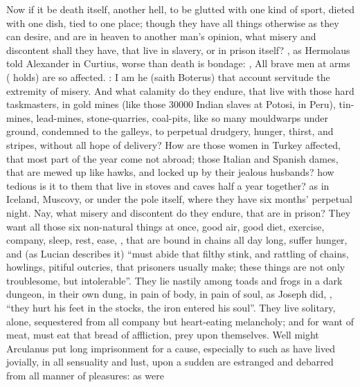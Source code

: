 Now if it be death itself, another hell, to be glutted with one kind of sport,
dieted with one dish, tied to one place; though they have all things otherwise
as they can desire, and are in heaven to another man's opinion, what misery and
discontent shall they have, that live in slavery, or in prison itself? , as Hermolaus told Alexander in
Curtius, worse than death is bondage:
, All brave men at arms (\Tully{} holds) are so affected.
: I am he (saith Boterus) that account servitude the
extremity of misery. And what calamity do they endure, that live with those
hard taskmasters, in gold mines (like those 30\thinspace{}000
Indian slaves at Potosi, in Peru), tin-mines, lead-mines,
stone-quarries, coal-pits, like so many mouldwarps under ground, condemned to
the galleys, to perpetual drudgery, hunger, thirst, and stripes, without all
hope of delivery? How are those women in Turkey affected, that most part of the
year come not abroad; those Italian and Spanish dames, that are mewed up like
hawks, and locked up by their jealous husbands? how tedious is it to them that
live in stoves and caves half a year together? as in Iceland, Muscovy, or under
the pole itself, where they have six months' perpetual
night. Nay, what misery and discontent do they endure, that are in prison? They
want all those six non-natural things at once, good air, good diet, exercise,
company, sleep, rest, ease, \etc{}, that are bound in chains all day long,
suffer hunger, and (as Lucian describes it) \enquote{must abide
that filthy stink, and rattling of chains, howlings, pitiful outcries, that
prisoners usually make; these things are not only troublesome, but
intolerable}. They lie nastily among toads and frogs in a dark dungeon, in
their own dung, in pain of body, in pain of soul, as Joseph did, , \enquote{they hurt his feet in the stocks, the iron entered his soul}.
They live solitary, alone, sequestered from all company but heart-eating
melancholy; and for want of meat, must eat that bread of affliction, prey upon
themselves. Well might Arculanus put long imprisonment for
a cause, especially to such as have lived jovially, in all sensuality and lust,
upon a sudden are estranged and debarred from all manner of pleasures: as were
